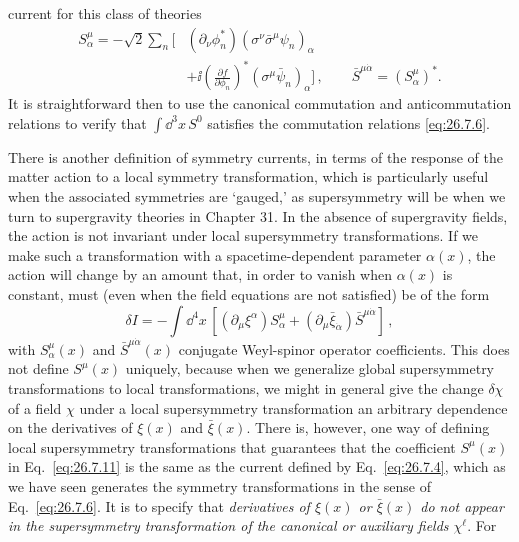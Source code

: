 current for this class of theories
\begin{equation}
  \begin{aligned}
  S^\mu_\alpha=-\sqrt{2}\sum_n\biggl[
    &(\partial_\nu\phi_n^*)
      (\sigma^\nu\bar\sigma^\mu\psi_n)_\alpha
  \\
    &+\ii\left(\frac{\partial f}{\partial\phi_n}\right)^*
      (\sigma^\mu\bar\psi_n)_\alpha
  \biggr]\,,
  \qquad
  \bar S^{\mu\dot\alpha}=(S^\mu_\alpha)^* .
  \end{aligned}
  \tag{26.7.10}\label{eq:26.7.10}
\end{equation}
It is straightforward then to use the canonical commutation and
anticommutation relations to verify that \(\int \dd^3x\,S^0\) satisfies the
commutation relations \eqref{eq:26.7.6}.

There is another definition of symmetry currents, in terms of the response
of the matter action to a local symmetry transformation, which is
particularly useful when the associated symmetries are `gauged,' as
supersymmetry will be when we turn to supergravity theories in Chapter 31.
In the absence of supergravity fields, the action is not invariant under
local supersymmetry transformations. If we make such a transformation with a
spacetime-dependent parameter \(\alpha(x)\), the action will change by an
amount that, in order to vanish when \(\alpha(x)\) is constant, must (even
when the field equations are not satisfied) be of the form
\begin{equation}
  \delta I
  =-\int \dd^4x\,
   \left[(\partial_\mu\xi^\alpha)S^\mu_\alpha
   +(\partial_\mu\bar\xi_{\dot\alpha})\bar S^{\mu\dot\alpha}\right]\,,
  \tag{26.7.11}\label{eq:26.7.11}
\end{equation}
with \(S^\mu_\alpha(x)\) and \(\bar S^{\mu\dot\alpha}(x)\) conjugate
Weyl-spinor operator coefficients.
This does not define \(S^\mu(x)\) uniquely, because when we generalize global
supersymmetry transformations to local transformations, we might in general
give the change \(\delta\chi\) of a field \(\chi\) under a local
supersymmetry transformation an arbitrary dependence on the derivatives of
\(\xi(x)\) and \(\bar\xi(x)\). There is, however, one way of defining local supersymmetry
transformations that guarantees that the coefficient \(S^\mu(x)\) in
Eq.~\eqref{eq:26.7.11} is the same as the current defined by
Eq.~\eqref{eq:26.7.4}, which as we have seen generates the symmetry
transformations in the sense of Eq.~\eqref{eq:26.7.6}. It is to specify that
\emph{derivatives of \(\xi(x)\) or \(\bar\xi(x)\) do not appear in the supersymmetry
transformation of the canonical or auxiliary fields \(\chi^\ell\)}. For
